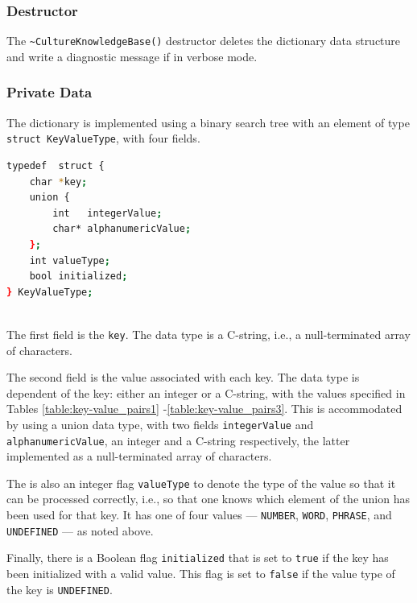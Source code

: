 \documentclass{CSSRforAfrica}
\begin{document}
\subsubsection{Destructor}

The  {\tt\small \verb+~+CultureKnowledgeBase()} destructor deletes the dictionary data structure and write a diagnostic message if in verbose mode.


\subsubsection{Private Data}

The dictionary is implemented using a binary search tree with an element of type\\ {\small \tt struct KeyValueType}, with four fields.

\begin{lstlisting}[style=withoutNumbering, language=bash]
typedef  struct {
    char *key;
    union {
        int   integerValue;
        char* alphanumericValue;  
    };
    int valueType;
    bool initialized;
} KeyValueType;
   
\end{lstlisting}


The first field is  the {\small \tt key}. The data type  is a C-string, i.e., a null-terminated array of characters.

The second field is the value associated with each key.  The data type is dependent of  the key: either an integer  or a C-string,  with the values specified in Tables \ref{table:key-value_pairs1} -\ref{table:key-value_pairs3}. This is accommodated by using a union data type, with two fields {\small \tt integerValue} and {\small \tt alphanumericValue},  an integer and  a C-string respectively, the latter implemented as a null-terminated array of characters.

The is also an integer flag {\small \tt valueType} to denote the type of the value so that it can be processed correctly, i.e., so that one knows which element of the union has been used for that key.  It has one of four values --- {\small \tt NUMBER},  {\small \tt WORD}, {\small \tt PHRASE}, and  {\small \tt UNDEFINED} --- as noted above.

Finally, there is a Boolean flag {\small \tt initialized} that is set to {\small \tt true} if the key has been initialized with a valid value.  This flag is set to {\small \tt false} if the value type of the key is {\small \tt UNDEFINED}.
\end{document}
